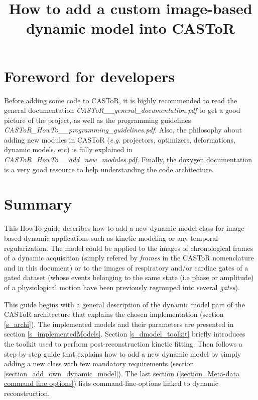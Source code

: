 \documentclass[a4paper, 11pt]{article}
\begin{document}
\title{How to add a custom image-based dynamic model into CASToR}
\maketitle

\section*{Foreword for developers}

Before adding some code to CASToR, it is highly recommended to read the general documentation \textit{CASToR\_\_general\_documentation.pdf} to get a good
picture of the project, as well as the programming guidelines \textit{CASToR\_HowTo\_\_programming\_guidelines.pdf}. Also, the philosophy about adding new
modules in CASToR (\textit{e.g.} projectors, optimizers, deformations, dynamic models, etc) is fully explained in \textit{CASToR\_HowTo\_\_add\_new\_modules.pdf}.
Finally, the doxygen documentation is a very good resource to help understanding the code architecture.


\section{Summary}

This HowTo guide describes how to add a new dynamic model class for image-based dynamic applications such as kinetic modeling or any temporal regularization. The model could be applied to the images of chronological frames of a dynamic acquisition (simply refered by \textit{frames} in the CASToR nomenclature and in this document) or to the images of respiratory and/or cardiac gates of a gated dataset (whose events belonging to the same state (i.e phase or amplitude) of a physiological motion have been previously regrouped into several \textit{gates}). 

\bigskip
This guide begins with a general description of the dynamic model part of the CASToR architecture that explains the chosen implementation (section \ref{s_archi}). The implemented models and their parameters are presented in section \ref{s_implementedModels}. Section \ref{s_dmodel_toolkit} briefly introduces the toolkit used to perform post-reconstruction kinetic fitting. Then follows a step-by-step guide that explains how to add a new dynamic model by simply adding a new class with few mandatory requirements (section \ref{section_add_own_dynamic_model}). The last section (\ref{section_Meta-data command line options}) lists command-line-options linked to dynamic reconstruction.
\end{document}
